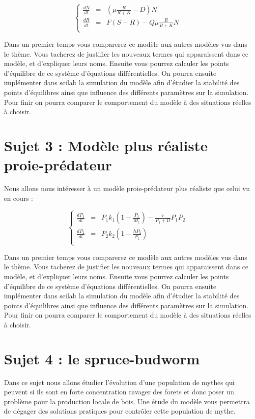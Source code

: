 \documentclass[12pt,a4paper]{article}
\begin{document}
\begin{displaymath}
\left\{
\begin{array}{lcl}
\frac{dN}{dt} & = &  (\mu \frac{R}{R + K} - D) N \\
\frac{dR}{dt} & = & F ( S - R ) - Q \mu \frac{R}{R + K} N\\
\end{array}
\right.
\end{displaymath}

Dans un premier temps vous comparerez ce modèle aux autres modèles vus dans le thème. Vous tacherez de justifier les nouveaux termes qui apparaissent dans ce modèle, et d'expliquer leurs noms. Ensuite vous pourrez calculer les points d'équilibre de ce système d'équations différentielles. On pourra ensuite implémenter dans scilab la simulation du modèle afin d'étudier la stabilité des points d'équilibres ainsi que influence des différents paramètres sur la simulation. 
Pour finir on pourra comparer le comportement du modèle à des situations réelles à choisir. 

\section*{Sujet 3 : Modèle plus réaliste proie-prédateur}

Nous allons nous intéresser à un modèle proie-prédateur plus réaliste que celui vu en cours :

\begin{displaymath}
\left\{
\begin{array}{lcl}
\frac{dP_1}{dt} & = & P_1 k_1 (1 - \frac{P_1}{M_1}) - \frac{r}{P_1 + D} P_1 P_2 \\
\frac{dP_2}{dt} & = & P_2 k_2 ( 1 - \frac{h P_2}{P_1} ) \\
\end{array}
\right.
\end{displaymath}

Dans un premier temps vous comparerez ce modèle aux autres modèles vus dans le thème. Vous tacherez de justifier les nouveaux termes qui apparaissent dans ce modèle, et d'expliquer leurs noms. Ensuite vous pourrez calculer les points d'équilibre de ce système d'équations différentielles. On pourra ensuite implémenter dans scilab la simulation du modèle afin d'étudier la stabilité des points d'équilibres ainsi que influence des différents paramètres sur la simulation. 
Pour finir on pourra comparer le comportement du modèle à des situations réelles à choisir. 

\section*{Sujet 4 : le spruce-budworm}

Dans ce sujet nous allons étudier l'évolution d'une population de mythes qui peuvent si ils sont en forte concentration ravager des forets et donc poser un problème pour la production locale de bois. Une étude du modèle vous permettra de dégager des solutions pratiques pour contrôler cette population de mythe.
\end{document}
